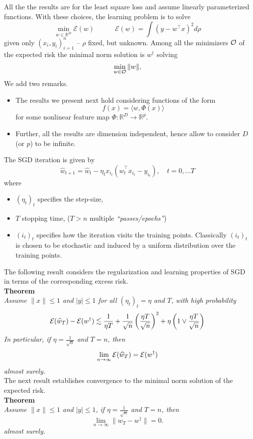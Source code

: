 \documentclass[10pt]{article}
\begin{document}
All the the results are for the least square loss  and assume linearly parameterized functions. With these choices, the learning problem is to solve
$$\min_{w\in {\mathbb R}^D} {\mathcal E}(w)\quad\quad\quad
{\mathcal E}(w)=
\int   (y-{w}^\top{x})^2d \rho$$
given only $(x_i,y_i)_{i=1}^n$ -- $\rho$ { fixed, but unknown}.
Among all the minimizers ${\cal O}$ of the expected risk the minimal norm  solution is 
$w^\dagger$ solving
$$
\min_{w\in {\cal O}} \| {w} \|,
$$
We add two remarks.
\begin{itemize}
\item 
The results we present next  hold considering functions of the form 
$$
f(x)=\langle{w}, {\Phi(x)}\rangle
$$
for some nonlinear feature map $\Phi:{\mathbb R}^D\to {\mathbb R}^p$. 
\item Further, all the results are dimension independent, hence allow to consider $D$ (or $p$) to be infinite.
\end{itemize}


The SGD iteration is given by 
$$
\widehat w _{t+1} =
\widehat w _{t}
-
\eta_t
x_{i_t}(\widehat w _{t}^\top  x_{i_t}-y_{i_t})  , \quad t=0, \dots T
$$
where 
\begin{itemize}
\item  $(\eta_t)_t$ specifies  the step-size, 
\item  $T$ stopping time,  ($T>n$ multiple {\em ``passes/epochs''})
\item   $(i_t)_t$ specifies how the iteration visits the training points.  Classically $(i_t)_t$ is chosen to be stochastic and induced by a uniform distribution over the training points.
\end{itemize}
The following result considers the regularization and learning properties of SGD in terms of the corresponding excess risk.\\
{\bf Theorem}\\
{\em 
Assume $\|x\|\le 1$ and $|y|\le 1$ for all $(\eta_t)_t=\eta$ and $T$, with high probability
$$
{\cal E}(\widehat w _T)- {\cal E}(w^\dagger)
\lesssim \frac{1}{\eta T}+
\frac{1}{\sqrt{n}}\left( \frac{\eta T}{\sqrt{n}}\right)^2 + \eta \left(1 \vee \frac{\eta T}{\sqrt{n}}\right)
$$
In particular, if  $\eta =\frac{1}{\sqrt{n}}$ and $T=n$, then 
$$
\lim_{n\to \infty}{\cal E}(\widehat w _T)= {\cal E}(w^\dagger)
$$
almost surely.
}\\
The next result  establishes convergence to the minimal norm solution of the expected risk.\\
{\bf Theorem}\\
{\em 
Assume $\|x\|\le 1$ and $|y|\le 1$, if $\eta=\frac{1}{\sqrt{n}}$ and $T=n$, then 
$$
\lim_{n\to \infty} \|w _T-w^\dagger\|=0.
$$
almost surely.
}
\end{document}
